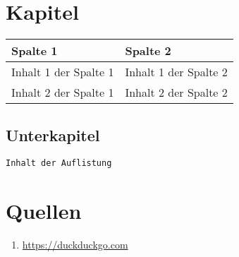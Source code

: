 \documentclass{article}
\title{\articletitle}
\author{\articleauthor}
\begin{document}
\maketitle

\begin{abstract}
  Das ist die Zusammenfassung des Artikels.
\end{abstract}

\newpage

\tableofcontents
\newpage

\section{Kapitel}

\begin{tabularx}{\textwidth}{|l|X|} \hline
  \textbf{Spalte 1} & \textbf{Spalte 2}  \\ \hline
  Inhalt 1 der Spalte 1 & Inhalt 1 der Spalte 2 \\ \hline
  Inhalt 2 der Spalte 1 & Inhalt 2 der Spalte 2 \\ \hline
\end{tabularx}

\subsection{Unterkapitel}

\begin{lstlisting}[label=listing label,caption=listing caption]
  Inhalt der Auflistung
\end{lstlisting}

\section{Quellen}

\begin{enumerate}
 \item \url{https://duckduckgo.com}
\end{enumerate}
\end{document}

